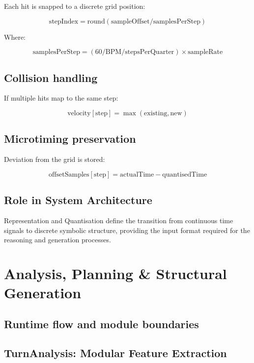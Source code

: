 Each hit is snapped to a discrete grid position:

\[
\mathrm{stepIndex} = \mathrm{round}(\mathrm{sampleOffset} / \mathrm{samplesPerStep})
\]

Where:

\[
\mathrm{samplesPerStep} = (60 / \mathrm{BPM} / \mathrm{stepsPerQuarter}) \times \mathrm{sampleRate}
\]

\subsection{Collision handling}\label{collision-handling}

If multiple hits map to the same step:

\[
\mathrm{velocity}[\mathrm{step}] = \max(\mathrm{existing}, \mathrm{new})
\]

\subsection{Microtiming preservation}\label{microtiming-preservation}

Deviation from the grid is stored:

\[
\mathrm{offsetSamples}[\mathrm{step}] = \mathrm{actualTime} - \mathrm{quantisedTime}
\]

\subsection{Role in System Architecture}\label{role-in-system-architecture-2}

Representation and Quantisation define the transition from continuous
time signals to discrete symbolic structure, providing the input format
required for the reasoning and generation processes.

\section{Analysis, Planning \& Structural Generation}\label{analysis-planning-structural-generation}

\subsection{Runtime flow and module boundaries}\label{runtime-flow-and-module-boundaries}


\subsection{TurnAnalysis: Modular Feature Extraction}\label{turnanalysis-modular-feature-extraction}

